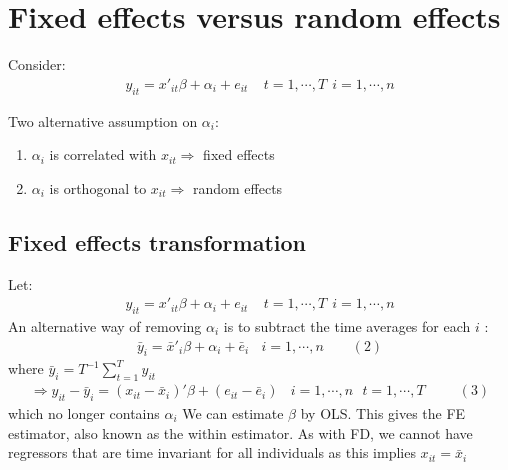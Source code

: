 \documentclass[a4paper,twoside,11pt]{article}
\begin{document}
\section{Fixed effects versus random effects}
Consider:
\begin{equation*}
\begin{aligned}
y_{it} = x'_{it} \beta + \alpha_i + e_{it} \ \ \ \ \ t=1,\cdots , T \ \ i =1,\cdots , n
\end{aligned}
\end{equation*}
\textcolor{NavyBlue}{Two alternative assumption on $\alpha_i$:
\begin{enumerate}
    \item $\alpha_i$ is correlated with $x_{it} \Rightarrow$ fixed effects
    \item $\alpha_i$ is orthogonal to $x_{it} \Rightarrow$ random effects
\end{enumerate}
}
\subsection{Fixed effects transformation}
Let:
\begin{equation*}
\begin{aligned}
y_{it} = x'_{it} \beta + \alpha_i + e_{it} \ \ \ \ \ t=1,\cdots , T \ \ i =1,\cdots , n
\end{aligned}
\end{equation*}
An alternative way of removing $\alpha_i$ is to subtract the time averages for
each $i$ :
\begin{equation*}
\begin{aligned}
\bar y_i = \bar x'_i \beta + \alpha_i + \bar e_i \ \ \ \ i=1,\cdots , n \ \ \ \ \ \ \ \ \ (2) 
\end{aligned}
\end{equation*}
where $\bar y_i = T^{-1} \sum^T_{t=1} y_{it}$
\begin{equation*}
\begin{aligned}
\Rightarrow y_{it} - \bar y_i = (x_{it} - \bar x_i)' \beta + (e_{it} - \bar e_i ) \ \ \ \ i = 1,\cdots , n \ \ \ t= 1,\cdots , T \ \ \ \ \ \ \ \ \ \ \ (3)
\end{aligned}
\end{equation*}
which no longer contains $\alpha_i$
\newline
We can estimate $\beta$ by OLS. This gives the FE estimator, also known as the within estimator. \textcolor{NavyBlue}{As with FD, we cannot have regressors that are time invariant for all individuals as this implies $x_{it} = \bar x_i$}
\end{document}
